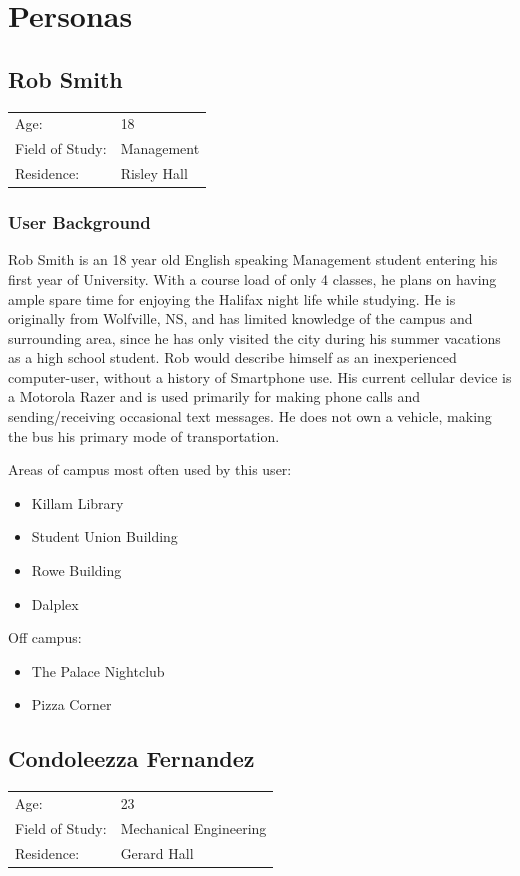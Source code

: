 \documentclass{article}
\begin{document}
\section{Personas}
\subsection{Rob Smith}
\begin{tabular}{ll}
Age: & 18 \\
Field of Study: & Management \\
Residence: & Risley Hall \\
\end{tabular}

\subsubsection{User Background}
Rob Smith is an 18 year old English speaking Management student entering his
first year of University. With a course load of only 4 classes, he plans on
having ample spare time for enjoying the Halifax night life while studying. He
is originally from Wolfville, NS, and has limited knowledge of the campus and
surrounding area, since he has only visited the city during his summer vacations
as a high school student. Rob would describe himself as an inexperienced
computer-user, without a history of Smartphone use. His current cellular device
is a Motorola Razer and is used primarily for making phone calls and
sending/receiving occasional text messages.  He does not own a vehicle, making
the bus his primary mode of transportation.

Areas of campus most often used by this user:
\begin{itemize}
\item Killam Library
\item Student Union Building 
\item Rowe Building
\item Dalplex 
\end{itemize}

Off campus:
\begin{itemize}
\item The Palace Nightclub
\item Pizza Corner 
\end{itemize}

\subsection{Condoleezza Fernandez}
\begin{tabular}{ll}
Age: & 23 \\
Field of Study: & Mechanical Engineering \\
Residence: & Gerard Hall \\
\end{tabular}
\end{document}
